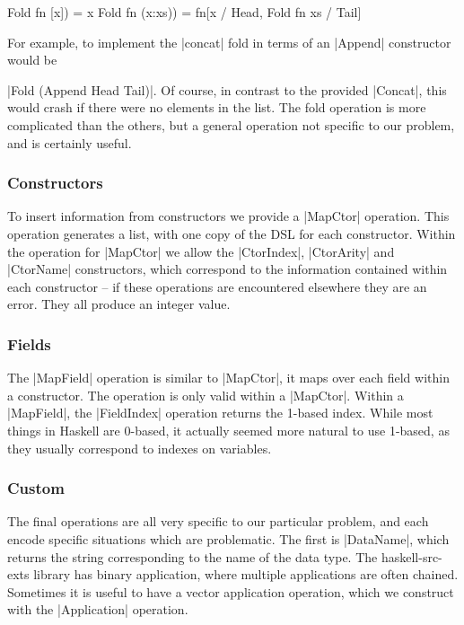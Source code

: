 \documentclass[preprint,draft]{sigplanconf}
\begin{document}
\ignore\begin{code}
Fold fn [x]) = x
Fold fn (x:xs)) = fn[x / Head, Fold fn xs / Tail]
\end{code}

For example, to implement the |concat| fold in terms of an |Append| constructor would be \ignore|Fold (Append Head Tail)|. Of course, in contrast to the provided |Concat|, this would crash if there were no elements in the list. The fold operation is more complicated than the others, but a general operation not specific to our problem, and is certainly useful.

\subsubsection{Constructors}

To insert information from constructors we provide a |MapCtor| operation. This operation generates a list, with one copy of the DSL for each constructor. Within the operation for |MapCtor| we allow the |CtorIndex|, |CtorArity| and |CtorName| constructors, which correspond to the information contained within each constructor -- if these operations are encountered elsewhere they are an error. They all produce an integer value.

\subsubsection{Fields}

The |MapField| operation is similar to |MapCtor|, it maps over each field within a constructor. The operation is only valid within a |MapCtor|. Within a |MapField|, the |FieldIndex| operation returns the 1-based index. While most things in Haskell are 0-based, it actually seemed more natural to use 1-based, as they usually correspond to indexes on variables.

\subsubsection{Custom}

The final operations are all very specific to our particular problem, and each encode specific situations which are problematic. The first is |DataName|, which returns the string corresponding to the name of the data type. The haskell-src-exts library has binary application, where multiple applications are often chained. Sometimes it is useful to have a vector application operation, which we construct with the |Application| operation.
\end{document}

